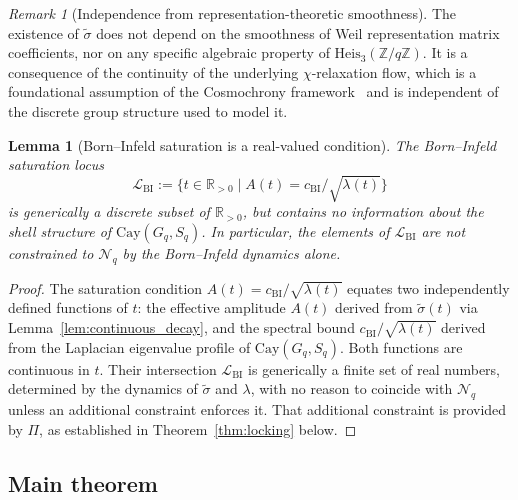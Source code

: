 \documentclass[12pt,a4paper]{article}
\newtheorem{lemma}[theorem]{Lemma}
\theoremstyle{remark}
\newtheorem{remark}[theorem]{Remark}
\newcommand{\cchi}{c_{\mathrm{BI}}}
\newcommand{\Cay}{\mathrm{Cay}(G_q, S_q)}
\newcommand{\Heis}{\mathrm{Heis}_3(\mathbb{Z}/q\mathbb{Z})}
\begin{document}
    \begin{remark}[Independence from representation-theoretic smoothness]
      \label{rem:no_rep_smoothness}
      The existence of $\tilde{\sigma}$ does not depend on the smoothness of Weil
      representation matrix coefficients, nor on any specific algebraic property of
      $\Heis$.
      It is a consequence of the continuity of the underlying $\chi$-relaxation flow,
      which is a foundational assumption of the Cosmochrony framework~\cite{Cosmochrony}
      and is independent of the discrete group structure used to model it.
    \end{remark}

    \begin{lemma}[Born--Infeld saturation is a real-valued condition]
      \label{lem:bi_real}
      The Born--Infeld saturation locus
      \begin{equation}
        \label{eq:bi_locus}
        \mathcal{L}_{\mathrm{BI}} :=
        \bigl\{ t \in \mathbb{R}_{>0} \;\big|\; A(t) = \cchi / \sqrt{\lambda(t)} \bigr\}
      \end{equation}
      is generically a discrete subset of $\mathbb{R}_{>0}$, but contains no information about
      the shell structure of $\Cay$.
      In particular, the elements of $\mathcal{L}_{\mathrm{BI}}$ are not constrained to
      $\mathcal{N}_q$ by the Born--Infeld dynamics alone.
    \end{lemma}

    \begin{proof}
      The saturation condition $A(t) = \cchi / \sqrt{\lambda(t)}$ equates two independently
      defined functions of $t$: the effective amplitude $A(t)$ derived from $\tilde{\sigma}(t)$
      via Lemma~\ref{lem:continuous_decay}, and the spectral bound $\cchi/\sqrt{\lambda(t)}$
      derived from the Laplacian eigenvalue profile of $\Cay$.
      Both functions are continuous in $t$.
      Their intersection $\mathcal{L}_{\mathrm{BI}}$ is generically a finite set of real numbers,
      determined by the dynamics of $\tilde{\sigma}$ and $\lambda$, with no reason to
      coincide with $\mathcal{N}_q$ unless an additional constraint enforces it.
      That additional constraint is provided by $\Pi$, as established in
      Theorem~\ref{thm:locking} below.
    \end{proof}

  \subsection{Main theorem}
    \label{subsec:main_theorem}
\end{document}
